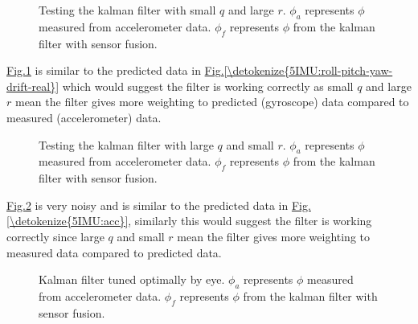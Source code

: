 \documentclass[letterpaper,10pt,english]{jupyterBook}
\begin{document}
\begin{figure}[htbp]
\centering
\capstart

\noindent{}
\caption{Testing the kalman filter with small \(q\) and large \(r\). \(\phi_a\) represents \(\phi\) measured from accelerometer data. \(\phi_f\) represents \(\phi\) from the kalman filter with sensor fusion. }\label{\detokenize{5IMU:test1}}\end{figure}

\sphinxAtStartPar
\hyperref[\detokenize{5IMU:test1}]{Fig.\@ \ref{\detokenize{5IMU:test1}}} is similar to the predicted data in \hyperref[\detokenize{5IMU:roll-pitch-yaw-drift-real}]{Fig.\@ \ref{\detokenize{5IMU:roll-pitch-yaw-drift-real}}} which would suggest the filter is working correctly as small \(q\) and large \(r\) mean the filter gives more weighting to predicted (gyroscope) data compared to measured (accelerometer) data.

\begin{figure}[htbp]
\centering
\capstart

\noindent{}
\caption{Testing the kalman filter with large \(q\) and small \(r\). \(\phi_a\) represents \(\phi\) measured from accelerometer data. \(\phi_f\) represents \(\phi\) from the kalman filter with sensor fusion. }\label{\detokenize{5IMU:test2}}\end{figure}

\sphinxAtStartPar
\hyperref[\detokenize{5IMU:test2}]{Fig.\@ \ref{\detokenize{5IMU:test2}}} is very noisy and is similar to the predicted data in \hyperref[\detokenize{5IMU:acc}]{Fig.\@ \ref{\detokenize{5IMU:acc}}}, similarly this would suggest the filter is working correctly since large \(q\) and small \(r\) mean the filter gives more weighting to measured data compared to predicted data.

\begin{figure}[htbp]
\centering
\capstart

\noindent{}
\caption{Kalman filter tuned optimally by eye. \(\phi_a\) represents \(\phi\) measured from accelerometer data. \(\phi_f\) represents \(\phi\) from the kalman filter with sensor fusion. }\label{\detokenize{5IMU:tuning}}\end{figure}
\end{document}
